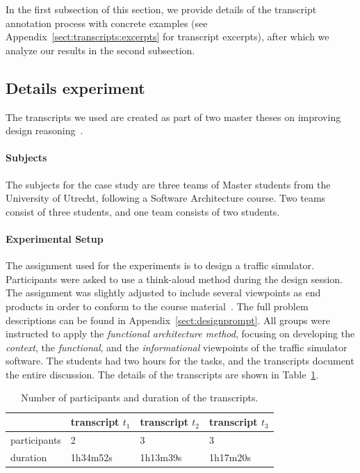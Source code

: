 In the first subsection of this section, we provide details of the transcript annotation process with concrete examples (see Appendix~\ref{sect:transcripts:excerpts} for transcript excerpts), after which we analyze our results in the second subsection.

\subsection{Details experiment}

The transcripts we used are created as part of two master theses on improving design reasoning~\cite{masterthesis1,masterthesis2}.

\paragraph{Subjects} The subjects for the case study are three teams of Master students from the University of Utrecht, following a Software Architecture course. Two teams consist of three students, and one team consists of two students.

\paragraph{Experimental Setup} The assignment used for the experiments is to design a traffic simulator. Participants were asked to use a think-aloud method during the design session. The assignment was slightly adjusted to include several viewpoints as end products in order to conform to the course material~\cite{Bass:2012:SAP:2392670}. The full problem descriptions can be found in Appendix~\ref{sect:designprompt}. All groups were instructed to apply the \emph{functional architecture method}, focusing on developing the \emph{context}, the \emph{functional}, and the \emph{informational} viewpoints of the traffic simulator software. The students had two hours for the tasks, and the transcripts document the entire discussion. The details of the transcripts are shown in Table~\ref{table:transcripts:info}.

\begin{table}[ht]
\centering
\begin{tabular}{|l|l|l|l|}
\hline
& transcript $t_1$ & transcript $t_2$ & transcript $t_3$\\
\hline
participants & 2 & 3 & 3\\
\hline
duration & 1h34m52s & 1h13m39s & 1h17m20s\\
\hline
\end{tabular}
\caption{Number of participants and duration of the transcripts.}
\label{table:transcripts:info}
\end{table}

